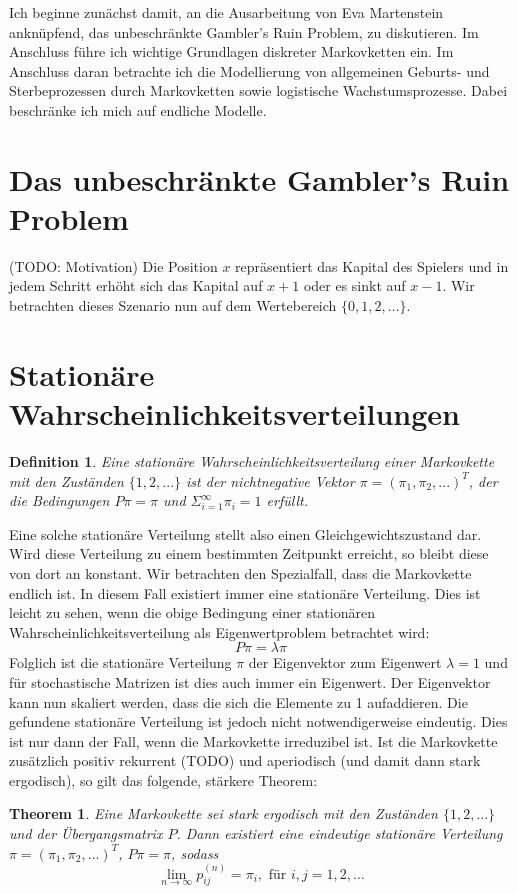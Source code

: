 \documentclass{article}
\newtheorem{defi}{Definition}
\newtheorem{thm}{Theorem}
\begin{document}
Ich beginne zunächst damit, an die Ausarbeitung von Eva Martenstein
anknüpfend, das unbeschränkte Gambler's Ruin Problem, zu diskutieren. Im Anschluss führe ich wichtige Grundlagen diskreter Markovketten ein. Im
Anschluss daran betrachte ich die Modellierung von allgemeinen
Geburts- und Sterbeprozessen durch Markovketten sowie logistische Wachstumsprozesse. Dabei beschränke ich mich auf endliche Modelle.
\section{Das unbeschränkte Gambler's Ruin Problem}
(TODO: Motivation)
Die Position $x$ repräsentiert das Kapital des Spielers und in jedem Schritt erhöht sich das Kapital auf $x+1$ oder es sinkt auf $x-1$. Wir betrachten dieses Szenario nun auf dem Wertebereich $\{0,1,2,\dots\}$. 
\section{Stationäre Wahrscheinlichkeitsverteilungen}
\begin{defi}
  Eine stationäre Wahrscheinlichkeitsverteilung einer Markovkette mit den Zuständen $\{1,2,...\}$ ist der nichtnegative Vektor $π = (π_1,π_2,...)^T$, der die Bedingungen $Pπ = π$ und $Σ_{i=1}^∞π_i = 1$ erfüllt.
\end{defi}
Eine solche stationäre Verteilung stellt also einen
Gleichgewichtszustand dar. Wird diese Verteilung zu einem bestimmten
Zeitpunkt erreicht, so bleibt diese von dort an konstant.
Wir betrachten den Spezialfall, dass die Markovkette endlich ist. In
diesem Fall existiert immer eine stationäre Verteilung. Dies ist
leicht zu sehen, wenn die obige Bedingung einer stationären
Wahrscheinlichkeitsverteilung als Eigenwertproblem betrachtet wird:
\[
  Pπ = λπ
\]
Folglich ist die stationäre Verteilung $π$ der Eigenvektor zum
Eigenwert $λ=1$ und für stochastische Matrizen ist dies auch immer ein
Eigenwert. Der Eigenvektor kann nun skaliert werden, dass die sich die
Elemente zu 1 aufaddieren. Die gefundene stationäre Verteilung ist
jedoch nicht notwendigerweise eindeutig. Dies ist nur dann der Fall,
wenn die Markovkette irreduzibel ist. Ist die Markovkette zusätzlich
positiv rekurrent (TODO) und aperiodisch (und damit dann stark
ergodisch), so gilt das folgende, stärkere Theorem:
\begin{thm}
  Eine Markovkette sei stark ergodisch mit den Zuständen
  $\{1,2,\dots\}$ und der Übergangsmatrix $P$. Dann existiert eine
  eindeutige stationäre Verteilung $π = (π_1,π_2,\dots)^T$, $Pπ = π$,
  sodass
  \[
    \lim_{n →∞}p_{ij}^{(n)} = π_i, \text{ für } i,j=1,2,\dots
  \]
\end{thm}
\end{document}
